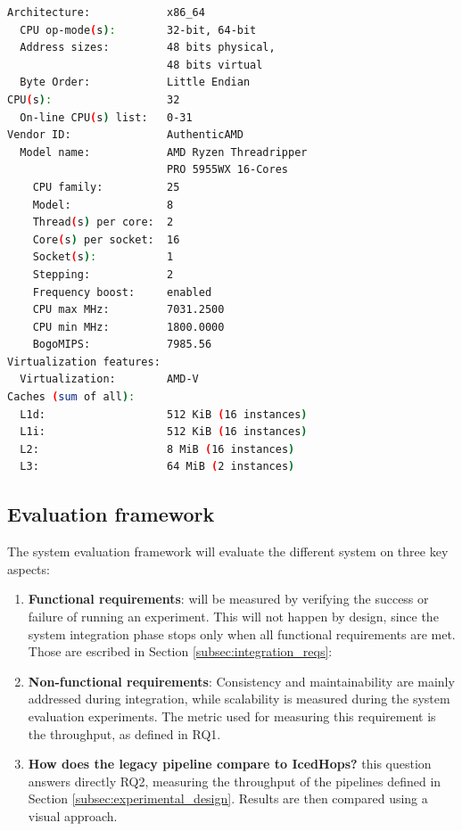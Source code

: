 \begin{lstlisting}[language=bash, caption={[Experimental environment details]Output of a \textit{lscpu} bash command on the machine.}, label={lst:cpu_snurran}, frame=tb, basicstyle=\small]
Architecture:            x86_64
  CPU op-mode(s):        32-bit, 64-bit
  Address sizes:         48 bits physical, 
                         48 bits virtual
  Byte Order:            Little Endian
CPU(s):                  32
  On-line CPU(s) list:   0-31
Vendor ID:               AuthenticAMD
  Model name:            AMD Ryzen Threadripper 
                         PRO 5955WX 16-Cores
    CPU family:          25
    Model:               8
    Thread(s) per core:  2
    Core(s) per socket:  16
    Socket(s):           1
    Stepping:            2
    Frequency boost:     enabled
    CPU max MHz:         7031.2500
    CPU min MHz:         1800.0000
    BogoMIPS:            7985.56
Virtualization features: 
  Virtualization:        AMD-V
Caches (sum of all):     
  L1d:                   512 KiB (16 instances)
  L1i:                   512 KiB (16 instances)
  L2:                    8 MiB (16 instances)
  L3:                    64 MiB (2 instances)
\end{lstlisting}



\subsection{Evaluation framework}
\label{subsec:method_eval_framework_hudi_iceberg}

The system evaluation framework will evaluate the different system on three key aspects:
\begin{enumerate}
    \item \textbf{Functional requirements}: will be measured by verifying the success or failure of running an experiment. This will not happen by design, since the system integration phase stops only when all functional requirements are met. Those are escribed in Section \ref{subsec:integration_reqs}:
    \item \textbf{Non-functional requirements}: Consistency and maintainability are mainly addressed during integration, while scalability is measured during the system evaluation experiments. The metric used for measuring this requirement is the throughput, as defined in \gls{RQ}1.
    \item \textbf{How does the legacy pipeline compare to IcedHops?} this question answers directly \gls{RQ}2, measuring the throughput of the pipelines defined in Section \ref{subsec:experimental_design}. Results are then compared using a visual approach.
\end{enumerate} 



